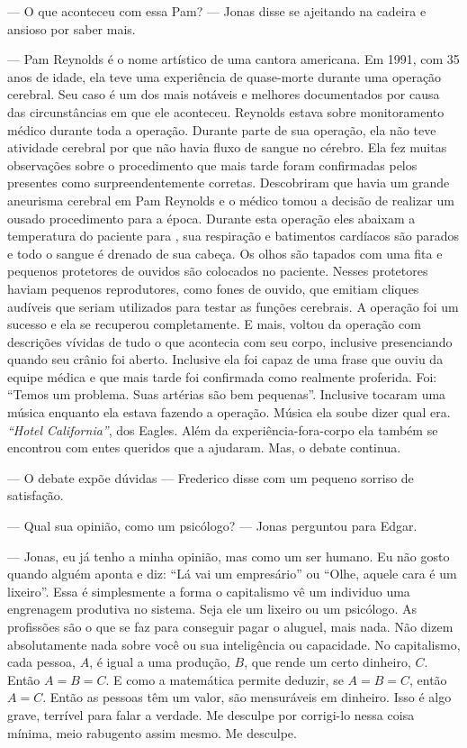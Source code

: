 --- O que aconteceu com essa Pam? --- Jonas disse se ajeitando na cadeira e ansioso por saber mais.

--- Pam Reynolds é o nome artístico de uma cantora americana. Em 1991, com 35 anos de idade, ela teve uma experiência de quase-morte durante uma operação cerebral. Seu caso é um dos mais notáveis e melhores documentados por causa das circunstâncias em que ele aconteceu. Reynolds estava sobre monitoramento médico durante toda a operação. Durante parte de sua operação, ela não teve atividade cerebral por que não havia fluxo de sangue no cérebro. Ela fez muitas observações sobre o procedimento que mais tarde foram confirmadas pelos presentes como surpreendentemente corretas. Descobriram que havia um grande aneurisma cerebral em Pam Reynolds e o médico tomou a decisão de realizar um ousado procedimento\mudanca{,} para a época. Durante esta operação eles abaixam a temperatura do paciente para , sua respiração e batimentos cardíacos são parados e todo o sangue é drenado de sua cabeça. Os olhos são tapados com uma fita e pequenos protetores de ouvidos são colocados no paciente. Nesses protetores haviam pequenos reprodutores, como fones de ouvido, que emitiam cliques audíveis que seriam utilizados para testar as funções cerebrais. A operação foi um sucesso e ela se recuperou completamente. E mais, voltou da operação com descrições vívidas de tudo o que acontecia com seu corpo, inclusive presenciando quando seu crânio foi aberto. Inclusive\mudanca{,} ela foi capaz de  uma frase que ouviu da equipe médica e que mais tarde foi confirmada como realmente proferida. Foi: ``Temos um problema. Suas artérias são bem pequenas''. Inclusive tocaram uma música enquanto ela estava fazendo a operação. Música  ela soube dizer qual era. \foreignlanguage{english}{\emph{``Hotel California''}}, dos Eagles. Além da experiência-fora-corpo\mudanca{,} ela também se encontrou com entes queridos\mudanca{,} que a ajudaram. Mas, o debate continua.

--- O debate expõe dúvidas --- Frederico disse\mudanca{,} com um pequeno sorriso de satisfação.

--- Qual sua opinião, como um psicólogo? --- Jonas perguntou para Edgar.

--- Jonas, eu já tenho a minha opinião, mas como um ser humano. Eu não gosto quando alguém aponta e diz: ``Lá vai um empresário'' ou ``Olhe, aquele cara é um lixeiro''. Essa é simplesmente a forma  o capitalismo vê um individuo\mudanca{:} uma engrenagem produtiva no sistema. Seja ele um lixeiro ou um psicólogo. As profissões são o que se faz para conseguir pagar o aluguel, mais nada. Não dizem absolutamente nada sobre você ou sua inteligência ou capacidade. No capitalismo, cada pessoa, $A$, é igual a uma produção, $B$, que rende um certo dinheiro, $C$. Então $A = B = C$. E como a matemática permite deduzir, se $A = B = C$, então $ A = C$. Então as pessoas têm um valor, são mensuráveis em dinheiro. Isso é algo grave, terrível\mudanca{,} para falar a verdade. Me desculpe por corrigi-lo nessa coisa mínima,  meio rabugento\mudanca{,} assim mesmo. Me desculpe.

